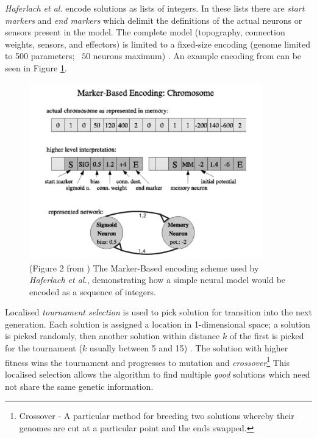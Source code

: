 \documentclass[a4paper,11pt,twoside,openright]{article}
\begin{document}
\textit{Haferlach et al.} encode solutions as lists of integers. In these lists
there are \textit{start markers} and \textit{end markers} which delimit
the definitions of the actual neurons or sensors present in the model. The
complete model (topography, connection weights, sensors, and effectors) is
limited to a fixed-size encoding (genome limited to 500 parameters; ~$50$ neurons
maximum) \cite{Haferlach2007}. An example encoding from \cite{Haferlach2007} can
be seen in Figure \ref{fig:markerbasedencoding}.
\newline
\par


\begin{figure}[h!]
  \centering
  \includegraphics[width=0.9\textwidth]{MarkerBasedEncoding}
  \caption{\label{fig:markerbasedencoding} (Figure 2 from \cite{Haferlach2007})
    The Marker-Based encoding scheme used by \textit{Haferlach et al.},
    demonstrating how a simple neural model would be encoded as a sequence of
    integers.}
\end{figure}

Localised \textit{tournament selection} is used
to pick solution for transition into the next generation. Each
solution is assigned a location in 1-dimensional space; a solution is
picked randomly, then another solution within distance $k$ of the
first is picked for the tournament ($k$ usually between 5 and 15)
\cite{Haferlach2007}. The solution with higher fitness wins the
tournament and progresses to mutation and
\textit{crossover}\footnote{Crossover - A particular method for
  breeding two solutions whereby their genomes are cut at a particular
  point and the ends swapped.} This localised selection allows the
algorithm to find multiple \textit{good} solutions which need not
share the same genetic information.
\newline
\par
\end{document}
